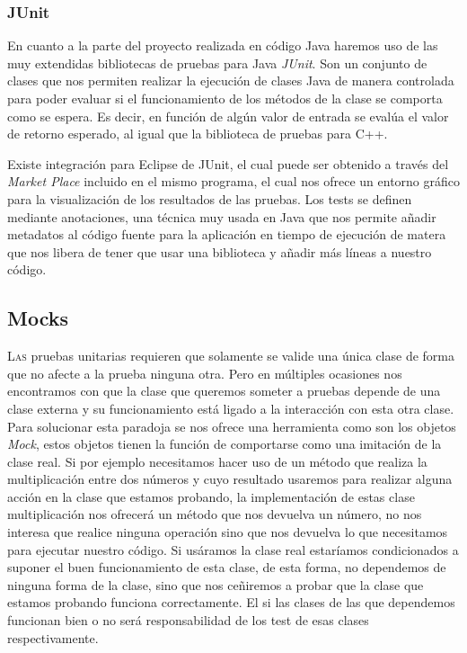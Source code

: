 \documentclass[12pt,a4paper,spanish]{book} %
\begin{document}
 \subsubsection{JUnit}
 
 En cuanto a la parte del proyecto realizada en código Java haremos uso de las muy extendidas bibliotecas de pruebas para Java \emph{JUnit}. Son un conjunto de clases que nos permiten realizar la ejecución de clases Java de manera controlada para poder evaluar si el funcionamiento de los métodos de la clase se comporta como se espera. Es decir, en función de algún valor de entrada se evalúa el valor de retorno esperado, al igual que la biblioteca de pruebas para C++.
 
 Existe integración para Eclipse de JUnit, el cual puede ser obtenido a través del \emph{Market Place} incluido en el mismo programa, el cual nos ofrece un entorno gráfico para la visualización de los resultados de las pruebas. Los tests se definen mediante anotaciones, una técnica muy usada en Java que nos permite añadir metadatos al código fuente para la aplicación en tiempo de ejecución de matera que nos libera de tener que usar una biblioteca y añadir más líneas a nuestro código.
 
\subsection{Mocks}

\lettrine{L}{as} pruebas unitarias requieren que solamente se valide una única clase de forma que no afecte a la prueba ninguna otra. Pero en múltiples ocasiones nos encontramos con que la clase que queremos someter a pruebas depende de una clase externa y su funcionamiento está ligado a la interacción con esta otra clase. Para solucionar esta paradoja se nos ofrece una herramienta como son los objetos \emph{Mock}, estos objetos tienen la función de comportarse como una imitación de la clase real. Si por ejemplo necesitamos hacer uso de un método que realiza la multiplicación entre dos números y cuyo resultado usaremos para realizar alguna acción en la clase que estamos probando, la implementación de estas clase multiplicación nos ofrecerá un método que nos devuelva un número, no nos interesa que realice ninguna operación sino que nos devuelva lo que necesitamos para ejecutar nuestro código. Si usáramos la clase real estaríamos condicionados a suponer el buen funcionamiento de esta clase, de esta forma, no dependemos de ninguna forma de la clase, sino que nos ceñiremos a probar que la clase que estamos probando funciona correctamente. El si las clases de las que dependemos funcionan bien o no será responsabilidad de los test de esas clases respectivamente.
\end{document}
